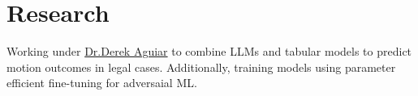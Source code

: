 \documentclass[]{resume-template}
\begin{document}
\begin{minipage}[t]{0.66\textwidth}

  \section{Research}\label{sec:research}
  \textbullet{} Working under \href{https://www.derekaguiar.com/}{Dr.Derek Aguiar} to combine LLMs and tabular models to predict motion outcomes in legal cases. Additionally, training models using parameter efficient fine-tuning for adversaial ML.



\end{minipage}
\end{document}
